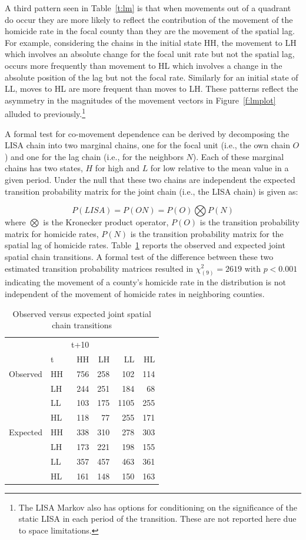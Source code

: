 \documentclass[11pt, titlepage]{article}
\begin{document}
A third pattern seen in Table~\ref{t:lm} is that when movements out of a
quadrant do occur they are more likely to reflect the contribution of
the movement of the homicide rate in the focal county than they are the
movement of the spatial lag. For example, considering the chains in the
initial state HH, the movement to LH which involves an absolute change
for the focal unit rate but not the spatial lag, occurs more frequently
than movement to HL which involves a change in the absolute position of
the lag but not the focal rate. Similarly for an initial state of LL,
moves to HL are more frequent than moves to LH. These patterns reflect
the asymmetry in the magnitudes of the movement vectors in
Figure~\ref{f:lmplot} alluded to previously.\footnote{The LISA Markov
also has options for conditioning on the significance of the static LISA
in each period of the transition. These are not reported here due to
space limitations.}

A formal test for co-movement dependence can be derived by decomposing
the LISA chain into two marginal chains, one for the focal unit (i.e.,
the own chain $O$) and one for the lag chain (i.e., for the neighbors
$N$). Each of these marginal chains has two states, $H$ for high and $L$
for low relative to the mean value in a given period. Under the null that these two chains are independent the expected
transition probability matrix for the joint chain (i.e., the LISA chain)
is given as:

\begin{equation}
	P(LISA) = P(ON) = P(O) \bigotimes P(N)
\end{equation}
where $\bigotimes$ is the Kronecker product operator, $P(O)$ is the
transition probability matrix for homicide rates, $P(N)$ is the
transition probability matrix for the spatial lag of homicide rates.
Table~\ref{t:jc} reports the observed and expected joint spatial chain
transitions. A formal test of the difference between these two estimated
transition probability matrices resulted in $\chi_{(9)}^2 = 2619$ with
$p<0.001$ indicating the movement of a county's homicide rate in the
distribution is not independent of the movement of homicide rates in
neighboring counties.


\begin{table}
  \centering
  \small
\begin{tabular}{|ll|rrrr|}\hline
        &  &t+10&&&\\
&t&HH&LH&LL&HL\\
\hline
Observed&HH&756 &258 &102 &114\\
&LH&244 &251 &184 &68\\
&LL&103 &175 &1105 &255\\
&HL&118 &77  &255 &171\\
\hline
Expected&HH&338 &310 &278 &303\\
&LH&173 &221 &198 &155\\
&LL&357 &457 &463 &361\\
&HL&161 &148 &150 &163\\
\hline
\end{tabular}
\caption{Observed versus expected joint spatial chain transitions}
\label{t:jc}
\end{table}
\end{document}

